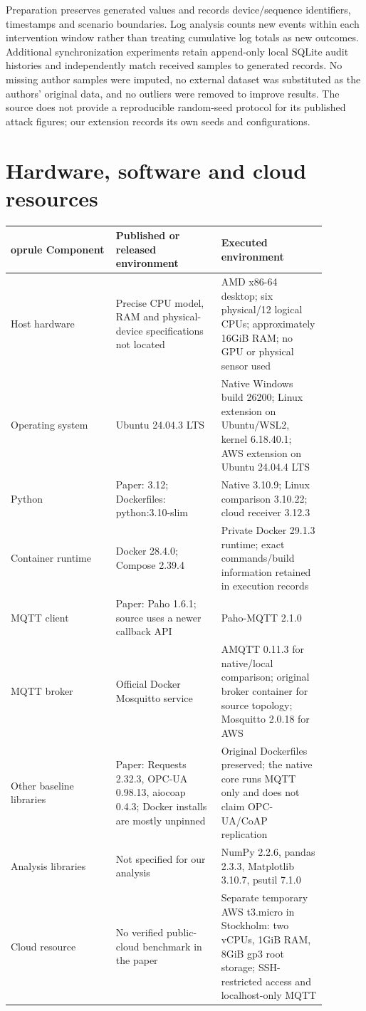 \documentclass[11pt,a4paper]{article}
\begin{document}
Preparation preserves generated values and records device/sequence identifiers, timestamps and scenario boundaries. Log analysis counts new events within each intervention window rather than treating cumulative log totals as new outcomes. Additional synchronization experiments retain append-only local SQLite audit histories and independently match received samples to generated records. No missing author samples were imputed, no external dataset was substituted as the authors' original data, and no outliers were removed to improve results. The source does not provide a reproducible random-seed protocol for its published attack figures; our extension records its own seeds and configurations.


\section{Hardware, software and cloud resources}

\begingroup\small\setlength{\tabcolsep}{3pt}\begin{longtable}{p{0.29333333333333333\linewidth}p{0.29333333333333333\linewidth}p{0.29333333333333333\linewidth}}	oprule
Component & Published or released environment & Executed environment \\
\midrule\endhead
Host hardware & Precise CPU model, RAM and physical-device specifications not located & AMD x86-64 desktop; six physical/12 logical CPUs; approximately 16GiB RAM; no GPU or physical sensor used \\
Operating system & Ubuntu 24.04.3 LTS & Native Windows build 26200; Linux extension on Ubuntu/WSL2, kernel 6.18.40.1; AWS extension on Ubuntu 24.04.4 LTS \\
Python & Paper: 3.12; Dockerfiles: python:3.10-slim & Native 3.10.9; Linux comparison 3.10.22; cloud receiver 3.12.3 \\
Container runtime & Docker 28.4.0; Compose 2.39.4 & Private Docker 29.1.3 runtime; exact commands/build information retained in execution records \\
MQTT client & Paper: Paho 1.6.1; source uses a newer callback API & Paho-MQTT 2.1.0 \\
MQTT broker & Official Docker Mosquitto service & AMQTT 0.11.3 for native/local comparison; original broker container for source topology; Mosquitto 2.0.18 for AWS \\
Other baseline libraries & Paper: Requests 2.32.3, OPC-UA 0.98.13, aiocoap 0.4.3; Docker installs are mostly unpinned & Original Dockerfiles preserved; the native core runs MQTT only and does not claim OPC-UA/CoAP replication \\
Analysis libraries & Not specified for our analysis & NumPy 2.2.6, pandas 2.3.3, Matplotlib 3.10.7, psutil 7.1.0 \\
Cloud resource & No verified public-cloud benchmark in the paper & Separate temporary AWS t3.micro in Stockholm: two vCPUs, 1GiB RAM, 8GiB gp3 root storage; SSH-restricted access and localhost-only MQTT \\
\bottomrule\end{longtable}\endgroup
\end{document}
